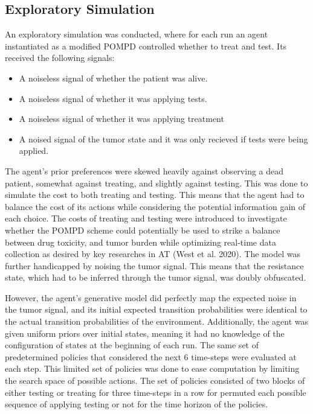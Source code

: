 \documentclass[
]{article}
\begin{document}
\subsection{Exploratory Simulation}\label{exploratory-simulation}

An exploratory simulation was conducted, where for each run an agent
instantiated as a modified POMPD controlled whether to treat and test.
Its received the following signals:

\begin{itemize}
\item
  A noiseless signal of whether the patient was alive.
\item
  A noiseless signal of whether it was applying tests.
\item
  A noiseless signal of whether it was applying treatment
\item
  A noised signal of the tumor state and it was only recieved if tests
  were being applied.
\end{itemize}

The agent's prior preferences were skewed heavily against observing a
dead patient, somewhat against treating, and slightly against testing.
This was done to simulate the cost to both treating and testing. This
means that the agent had to balance the cost of its actions while
considering the potential information gain of each choice. The costs of
treating and testing were introduced to investigate whether the POMPD
scheme could potentially be used to strike a balance between drug
toxicity, and tumor burden while optimizing real-time data collection as
desired by key researches in AT (West et al. 2020). The model was
further handicapped by noising the tumor signal. This means that the
resistance state, which had to be inferred through the tumor signal, was
doubly obfuscated.

However, the agent's generative model did perfectly map the expected
noise in the tumor signal, and its initial expected transition
probabilities were identical to the actual transition probabilities of
the environment. Additionally, the agent was given uniform priors over
initial states, meaning it had no knowledge of the configuration of
states at the beginning of each run. The same set of predetermined
policies that considered the next 6 time-steps were evaluated at each
step. This limited set of policies was done to ease computation by
limiting the search space of possible actions. The set of policies
consisted of two blocks of either testing or treating for three
time-steps in a row for permuted each possible sequence of applying
testing or not for the time horizon of the policies.
\end{document}
